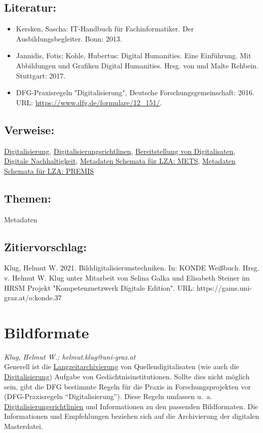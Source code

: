 \documentclass{article}
\begin{document}
        \subsection*{Literatur:}\begin{itemize}\item Kersken, Sascha: IT-Handbuch für Fachinformatiker. Der Ausbildungsbegleiter. Bonn: 2013.\item Jannidis, Fotis; Kohle, Hubertus: Digital Humanities. Eine Einführung. Mit Abbildungen und Grafiken Digital Humanities. Hrsg. von  und Malte Rehbein. Stuttgart: 2017.\item DFG-Praxisregeln "Digitalisierung", Deutsche Forschungsgemeinschaft: 2016. URL: \url{https://www.dfg.de/formulare/12_151/}.\end{itemize}\subsection*{Verweise:}\href{https://gams.uni-graz.at/o:konde.60}{Digitalisierung}, \href{https://gams.uni-graz.at/o:konde.63}{Digitalisierungsrichtlinen}, \href{https://gams.uni-graz.at/o:konde.36}{Bereitstellung von Digitalisaten}, \href{https://gams.uni-graz.at/o:konde.6}{Digitale Nachhaltigkeit}, \href{https://gams.uni-graz.at/o:konde.129}{Metadaten Schemata für LZA: METS}, \href{https://gams.uni-graz.at/o:konde.130}{Metadaten Schemata für LZA: PREMIS}\subsection*{Themen:}Metadaten\subsection*{Zitiervorschlag:}Klug, Helmut W. 2021. Bilddigitalisierunstechniken. In: KONDE Weißbuch. Hrsg. v. Helmut W. Klug unter Mitarbeit von Selina Galka und Elisabeth Steiner im HRSM Projekt "Kompetenznetzwerk Digitale Edition". URL: https://gams.uni-graz.at/o:konde.37\newpage\section*{Bildformate} \emph{Klug, Helmut W.; helmut.klug@uni-graz.at }\\
        
    Generell ist die \href{http://gams.uni-graz.at/o:konde.6}{Langzeitarchivierung} von Quellendigitalisaten (wie auch die \href{http://gams.uni-graz.at/o:konde.60}{Digitalisierung}) Aufgabe von Gedächtnisinstitutionen. Sollte dies nicht möglich sein, gibt die DFG bestimmte Regeln für die Praxis in Forschungsprojekten vor (DFG-Praxisregeln “Digitalisierung”). Diese Regeln umfassen u. a. \href{http://gams.uni-graz.at/o:konde.63}{Digitalisierungsrichtlinien} und Informationen zu den passenden Bildformaten. Die Informationen und Empfehlungen beziehen sich auf die Archivierung der digitalen Masterdatei.\\
            
\end{document}

